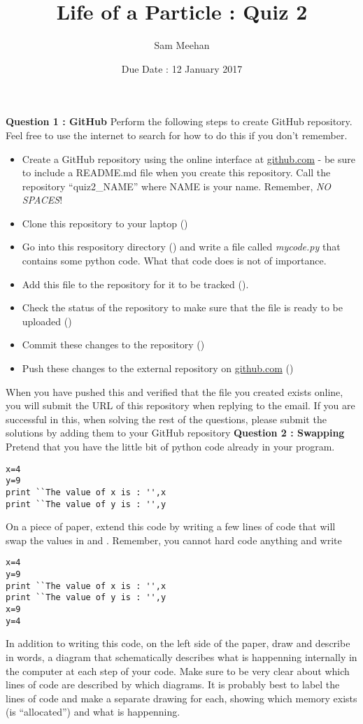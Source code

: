 \documentclass[12pt]{article}
\title{Life of a Particle : Quiz 2}
\author{Sam Meehan}
\date{Due Date : 12 January 2017}
\begin{document}
\maketitle

\textbf{Question 1 : GitHub}
Perform the following steps to create GitHub repository.  Feel free to use the internet to search for how to do this if you don't remember.
\begin{itemize}[noitemsep]
\item Create a GitHub repository using the online interface at \href{https://github.com}{github.com} - be sure to include a README.md file when you create this repository.  Call the repository ``quiz2\_NAME'' where NAME is your name.  Remember, \textit{NO SPACES}!
\item Clone this repository to your laptop (\small{})
\item Go into this respository directory (\small{}) and write a file called \textit{mycode.py} that contains some python code.  What that code does is not of importance.
\item Add this file to the repository for it to be tracked (\small{}).
\item Check the status of the repository to make sure that the file is ready to be uploaded (\small{})
\item Commit these changes to the repository (\small{})
\item Push these changes to the external repository on \href{https://github.com}{github.com} (\small{})
\end{itemize}
When you have pushed this and verified that the file you created exists online, you will submit the URL of this repository when replying to the email.  If you are successful in this, when solving the rest of the questions, please submit the solutions by adding them to your GitHub repository 
\newline
\newline
\textbf{Question 2 : Swapping}
Pretend that you have the little bit of python code already in your program.
\begin{lstlisting}
x=4
y=9
print ``The value of x is : '',x
print ``The value of y is : '',y
\end{lstlisting}
On a piece of paper, extend this code by writing a few lines of code that will swap the values in \small{} and \small{}.  Remember, you cannot hard code anything and write
\begin{lstlisting}
x=4
y=9
print ``The value of x is : '',x
print ``The value of y is : '',y
x=9
y=4
\end{lstlisting}
In addition to writing this code, on the left side of the paper, draw and describe in words, a diagram that schematically describes what is happenning internally in the computer at each step of your code.  Make sure to be very clear about which lines of code are described by which diagrams.  It is probably best to label the lines of code and make a separate drawing for each, showing which memory exists (is ``allocated'') and what is happenning.
\end{document}
